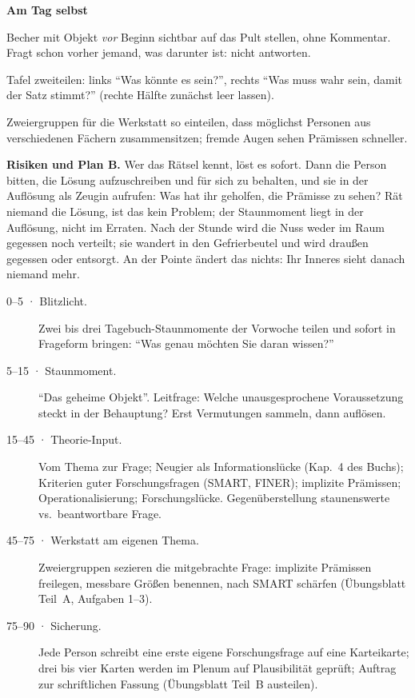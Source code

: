 \begin{vorbereitung}
\textbf{Am Tag selbst}
\begin{checkliste}
  \item Becher mit Objekt \emph{vor} Beginn sichtbar auf das Pult stellen,
    ohne Kommentar. Fragt schon vorher jemand, was darunter ist: nicht
    antworten.
  \item Tafel zweiteilen: links \enquote{Was könnte es sein?}, rechts
    \enquote{Was muss wahr sein, damit der Satz stimmt?} (rechte Hälfte
    zunächst leer lassen).
  \item Zweiergruppen für die Werkstatt so einteilen, dass möglichst
    Personen aus verschiedenen Fächern zusammensitzen; fremde Augen sehen
    Prämissen schneller.
\end{checkliste}

\textbf{Risiken und Plan B.} Wer das Rätsel kennt, löst es sofort. Dann
die Person bitten, die Lösung aufzuschreiben und für sich zu behalten, und
sie in der Auflösung als Zeugin aufrufen: Was hat ihr geholfen, die
Prämisse zu sehen? Rät niemand die Lösung, ist das kein Problem; der
Staunmoment liegt in der Auflösung, nicht im Erraten. Nach der Stunde wird
die Nuss weder im Raum gegessen noch verteilt; sie wandert in den
Gefrierbeutel und wird draußen gegessen oder entsorgt. An der Pointe
ändert das nichts: Ihr Inneres sieht danach niemand mehr.
\end{vorbereitung}

\begin{ablauf}
\begin{description}
\item[0--5 · Blitzlicht.] Zwei bis drei Tagebuch-Staunmomente der Vorwoche
  teilen und sofort in Frageform bringen: \enquote{Was genau möchten Sie
  daran wissen?}
\item[5--15 · Staunmoment.] \enquote{Das geheime Objekt}. Leitfrage:
  Welche unausgesprochene Voraussetzung steckt in der Behauptung? Erst
  Vermutungen sammeln, dann auflösen.
\item[15--45 · Theorie-Input.] Vom Thema zur Frage; Neugier als
  Informationslücke (Kap.~4 des Buchs); Kriterien guter Forschungsfragen
  (SMART, FINER); implizite Prämissen; Operationalisierung;
  Forschungslücke. Gegenüberstellung staunenswerte vs.\ beantwortbare
  Frage.
\item[45--75 · Werkstatt am eigenen Thema.] Zweiergruppen sezieren die
  mitgebrachte Frage: implizite Prämissen freilegen, messbare Größen
  benennen, nach SMART schärfen (Übungsblatt Teil~A, Aufgaben 1--3).
\item[75--90 · Sicherung.] Jede Person schreibt eine erste eigene
  Forschungsfrage auf eine Karteikarte; drei bis vier Karten werden im
  Plenum auf Plausibilität geprüft; Auftrag zur schriftlichen Fassung
  (Übungsblatt Teil~B austeilen).
\end{description}
\end{ablauf}

